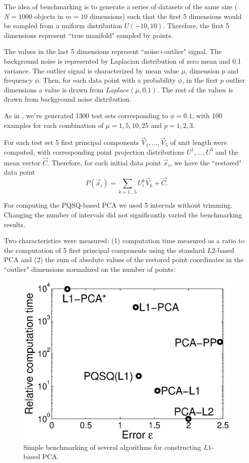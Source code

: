 \documentclass[preprint,12pt,twocolumn]{elsarticle}
\begin{document}
The idea of benchmarking is to generate a series of datasets of the same size ($N=1000$ objects in $m=10$ dimensions) such that the first 5 dimensions would be sampled from a uniform distribution $U(-10,10)$. Therefore, the first 5 dimensions represent ``true manifold" sampled by points. 

The values in the last 5 dimensions represent ``noise+outlier" signal. The background noise is represented by Laplacian distribution of zero mean and 0.1 variance. The outlier signal is characterized by mean value $\mu$, dimension $p$ and frequency $\phi$. Then, for each data point with a probability $\phi$, in the first $p$ outlier dimensions a value is drawn from $Laplace(\mu,0.1)$. The rest of the values is drawn from background noise distribution.

As in \cite{brooks2012pcal1}, we've generated 1300 test sets corresponding to $\phi=0.1$, with 100 examples for each combination of $\mu=1,5,10,25$ and $p=1,2,3$. 

For each test set 5 first principal components $\vec{V}_1,\dots,\vec{V}_{5}$ of unit length were computed, with corresponding point projection distributions $U^1,\dots,U^{5}$ and the mean vector $\vec{C}$. Therefore, for each initial data point $\vec{x}_i$, we have the ``restored" data point $$P(\vec{x}_i)=\sum_{k=1\dots 5}U^k_i\vec{V}_k+\vec{C}.$$ 

For computing the PQSQ-based PCA we used 5 intervals without trimming. Changing the number of intervals did not significantly varied the benchmarking results.

Two characteristics were measured: (1) computation time measured as a ratio to the computation of 5 first principal components using the standard $L2$-based PCA and (2) the sum of absolute values of the restored point coordinates in the ``outlier" dimensions normalized on the number of points:

\begin{figure}[h]
\centering\includegraphics[width=0.8\linewidth]{benchmark.eps}
\caption{Simple benchmarking of several algorithms for constructing $L1$-based PCA.\label{benchmark}}
\end{figure}
\end{document}
